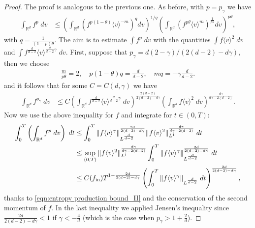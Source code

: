 \documentclass[12pt,american]{amsart}
\numberwithin{equation}{section}
\theoremstyle{plain}
\theoremstyle{definition}                  %
\def\fin{f_{\textnormal{in}}}
\begin{document}
  \begin{proof}
  The proof is analogous to the previous one. As before, with $p=p_\gamma$ we have
  \begin{align*}
      \int_{\mathbb{R}^d} f^p\;dv  & \le \left(\int_{\mathbb{R}^d} \left(f^{p(1-\theta)} \langle v \rangle^{-m}\right)^q dv\right)^{1/q} \left(\int_{\mathbb{R}^d} \left(f^{p\theta} \langle v \rangle^{m}\right)^{\frac{1}{p\theta}} dv\right)^{p\theta},
\end{align*}
  with $ q = \frac{1}{(1-p)\theta}$. The aim is to estimate $ \int f^p\;dv $ with the quantities $ \int f\langle v \rangle^{2}\;dv$ and $ \int f^{\frac{d}{d-2}}\langle v \rangle^{\frac{d}{d-2}\gamma}\;dv$. First, suppose that $p_\gamma = d(2-\gamma)/ (2(d-2)-d\gamma)$, then we choose
  \begin{align*}
      \frac{m}{p\theta} = 2, \quad {p(1-\theta)q}{} = \frac{d}{d-2}, \quad  mq = -\gamma\frac{d}{d-2}.
  \end{align*}
  and it follows that for some $C=C(d,\gamma)$ we have
  \begin{align*}
      \int_{\mathbb{R}^d} f^{p_\gamma}\;dv  & \leq C\left(\int_{\mathbb{R}^d} f^{\frac{d}{d-2}}\langle v \rangle^{{\frac{d}{d-2}}\gamma}\;dv\right)^{\frac{2(d-2)}{2(d-2)-d\gamma}}\left(\int_{\mathbb{R}^d} f\langle v \rangle^{2}\;dv\right)^{\frac{d\gamma}{d\gamma-2(d-2)}}.
  \end{align*}
  Now we use the above inequality for $f$ and integrate for $t\in (0,T)$: 
  \begin{align*}
    \int_0^T\left(\int_{\mathbb{R}^d} f^p \;dv\right)\;dt & \leq \int_0^T \|f \langle v\rangle^\gamma\|_{L^{\frac{d}{d-2}}}^{\frac{2d}{2(d-2)-d\gamma}} \|f \langle v\rangle^2\|_{L^1}^{\frac{d\gamma}{d\gamma-2(d-2)}}	\;dt \\
    & \leq   \sup_{(0,T)} \|f \langle v\rangle^2\|_{L^1}^{\frac{d\gamma}{d\gamma-2(d-2)}}\int_0^T \|f \langle v\rangle^\gamma\|_{L^{\frac{d}{d-2}}}^{\frac{2d}{2(d-2)-d\gamma}}\;dt \\
    & \leq C(\fin) T^{1- {\frac{2d}{2(d-2)-d\gamma}}}\left(\int_0^T \|f \langle v\rangle^\gamma\|_{L^{\frac{d}{d-2}}}\;dt\right)^{\frac{2d}{2(d-2)-d\gamma}},
  \end{align*}	
  thanks to \eqref{eqn:entropy production bound_II} and the conservation of the second momentum of $f$. In the last inequality we applied Jensen's inequality since $\frac{2d}{2(d-2)-d\gamma} <1$ if $\gamma <-\frac{4}{d}$ (which is the case when $p_\gamma>1+\frac{2}{d}$).
    

\end{proof}
\end{document}
